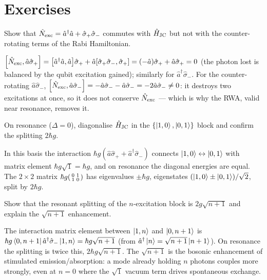 \section*{Exercises}

\begin{exercise}
Show that $\hat{N}_{\rm exc}=\hat a^\dagger\hat a+\hat\sigma_+\hat\sigma_-$
commutes with $\hat{H}_{\rm JC}$ but not with the counter-rotating
terms of the Rabi Hamiltonian.
\begin{solution}
$\comm{\op N_{\rm exc}}{\hat a\hat\sigma_+}=\comm{\hat a^\dagger\hat a}{\hat a}\hat\sigma_++\hat a\comm{\hat\sigma_+\hat\sigma_-}{\hat\sigma_+}
=(-\hat a)\hat\sigma_++\hat a\hat\sigma_+=0$ (the photon lost is
balanced by the qubit excitation gained); similarly for
$\hat a^\dagger\hat\sigma_-$. For the counter-rotating
$\hat a\hat\sigma_-$, $\comm{\op N_{\rm exc}}{\hat a\hat\sigma_-}=-\hat a\hat\sigma_--\hat a\hat\sigma_-=-2\hat a\hat\sigma_-\neq0$:
it destroys two excitations at once, so it does not conserve
$\hat{N}_{\rm exc}$ --- which is why the RWA, valid near resonance,
removes it.
\end{solution}
\end{exercise}

\begin{exercise}
On resonance ($\Delta=0$), diagonalise $\hat{H}_{\rm JC}$ in the
$\{\ket{1,0},\ket{0,1}\}$ block and confirm the splitting $2\hbar g$.
\begin{solution}
In this basis the interaction $\hbar g(\hat a\hat\sigma_++\hat a^\dagger\hat\sigma_-)$
connects $\ket{1,0}\leftrightarrow\ket{0,1}$ with matrix element
$\hbar g\sqrt{1}=\hbar g$, and on resonance the diagonal energies are
equal. The $2\times2$ matrix
$\hbar g\begin{psmallmatrix}0&1\\1&0\end{psmallmatrix}$ has
eigenvalues $\pm\hbar g$, eigenstates
$(\ket{1,0}\pm\ket{0,1})/\sqrt2$, split by $2\hbar g$.
\end{solution}
\end{exercise}

\begin{exercise}
Show that the resonant splitting of the $n$-excitation block is
$2g\sqrt{n+1}$ and explain the $\sqrt{n+1}$ enhancement.
\begin{solution}
The interaction matrix element between $\ket{1,n}$ and $\ket{0,n+1}$
is $\hbar g\bra{0,n+1}\hat a^\dagger\hat\sigma_-\ket{1,n}=\hbar g\sqrt{n+1}$
(from $\hat a^\dagger\ket n=\sqrt{n+1}\ket{n+1}$). On resonance the
splitting is twice this, $2\hbar g\sqrt{n+1}$. The $\sqrt{n+1}$ is
the bosonic enhancement of stimulated emission/absorption: a mode
already holding $n$ photons couples more strongly, even at $n=0$
where the $\sqrt1$ vacuum term drives spontaneous exchange.
\end{solution}
\end{exercise}

